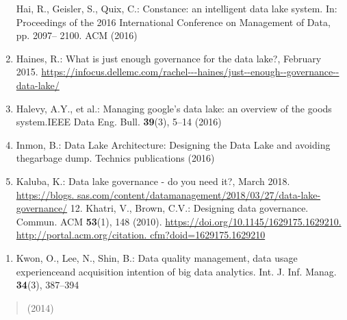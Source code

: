 \documentclass[a4paper,12pt,notitlepage,twoside,openright]{article}
\begin{document}
\begin{enumerate}
  Hai, R., Geisler, S., Quix, C.: Constance: an intelligent data lake
  system. In: Proceedings of the 2016 International Conference on
  Management of Data, pp. 2097-- 2100. ACM (2016)
\item
  Haines, R.: What is just enough governance for the data lake?,
  February 2015.
  \href{https://infocus.dellemc.com/rachel---haines/just--enough--governance--data--lake/}{https://infocus.dellemc.com/rachel-\/-\/-haines/just-\/-enough-\/-governance-\/-data-lake/}
\item
  Halevy, A.Y., et al.: Managing google's data lake: an overview of the
  goods system.IEEE Data Eng. Bull. \textbf{39}(3), 5--14 (2016)
\item
  Inmon, B.: Data Lake Architecture: Designing the Data Lake and
  avoiding thegarbage dump. Technics publications (2016)
\item
  Kaluba, K.: Data lake governance - do you need it?, March 2018.
  \href{https://blogs.sas.com/content/datamanagement/2018/03/27/data-lake-governance/}{https://blogs.
  sas.com/content/datamanagement/2018/03/27/data-lake-governance/} 12.
  Khatri, V., Brown, C.V.: Designing data governance. Commun. ACM
  \textbf{53}(1), 148 (2010).
  \href{https://doi.org/10.1145/1629175.1629210}{https://doi.org/10.1145/1629175.1629210.}
  \href{http://portal.acm.org/citation.cfm?doid=1629175.1629210}{http://portal.acm.org/citation.
  cfm?doid=1629175.1629210}
\end{enumerate}

\begin{enumerate}
\def\labelenumi{\arabic{enumi}.}
\setcounter{enumi}{12}
\item
  Kwon, O., Lee, N., Shin, B.: Data quality management, data usage
  experienceand acquisition intention of big data analytics. Int. J.
  Inf. Manag. \textbf{34}(3), 387--394
\end{enumerate}

\begin{quote}
(2014)
\end{quote}
\end{document}
